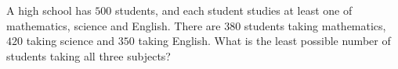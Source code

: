 A high school has $500$ students, and each student studies at least one of mathematics, science and English. There are $380$ students taking mathematics, $420$ taking science and $350$ taking English. What is the least possible number of students taking all three subjects?
